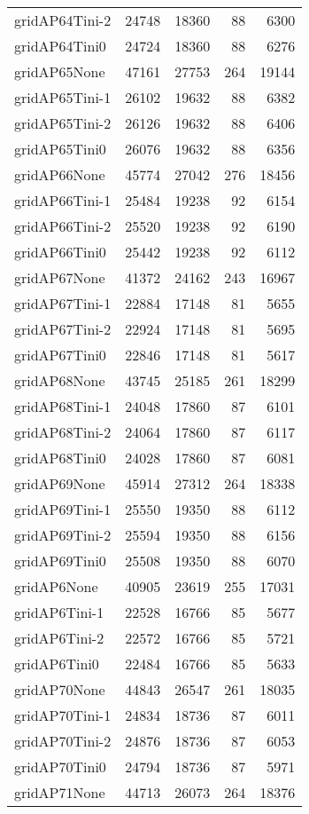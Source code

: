 \begin{longtable}{lrrrr}
gridAP64Tini-2 & 24748 & 18360 & 88 & 6300 \\
gridAP64Tini0 & 24724 & 18360 & 88 & 6276 \\
gridAP65None & 47161 & 27753 & 264 & 19144 \\
gridAP65Tini-1 & 26102 & 19632 & 88 & 6382 \\
gridAP65Tini-2 & 26126 & 19632 & 88 & 6406 \\
gridAP65Tini0 & 26076 & 19632 & 88 & 6356 \\
gridAP66None & 45774 & 27042 & 276 & 18456 \\
gridAP66Tini-1 & 25484 & 19238 & 92 & 6154 \\
gridAP66Tini-2 & 25520 & 19238 & 92 & 6190 \\
gridAP66Tini0 & 25442 & 19238 & 92 & 6112 \\
gridAP67None & 41372 & 24162 & 243 & 16967 \\
gridAP67Tini-1 & 22884 & 17148 & 81 & 5655 \\
gridAP67Tini-2 & 22924 & 17148 & 81 & 5695 \\
gridAP67Tini0 & 22846 & 17148 & 81 & 5617 \\
gridAP68None & 43745 & 25185 & 261 & 18299 \\
gridAP68Tini-1 & 24048 & 17860 & 87 & 6101 \\
gridAP68Tini-2 & 24064 & 17860 & 87 & 6117 \\
gridAP68Tini0 & 24028 & 17860 & 87 & 6081 \\
gridAP69None & 45914 & 27312 & 264 & 18338 \\
gridAP69Tini-1 & 25550 & 19350 & 88 & 6112 \\
gridAP69Tini-2 & 25594 & 19350 & 88 & 6156 \\
gridAP69Tini0 & 25508 & 19350 & 88 & 6070 \\
gridAP6None & 40905 & 23619 & 255 & 17031 \\
gridAP6Tini-1 & 22528 & 16766 & 85 & 5677 \\
gridAP6Tini-2 & 22572 & 16766 & 85 & 5721 \\
gridAP6Tini0 & 22484 & 16766 & 85 & 5633 \\
gridAP70None & 44843 & 26547 & 261 & 18035 \\
gridAP70Tini-1 & 24834 & 18736 & 87 & 6011 \\
gridAP70Tini-2 & 24876 & 18736 & 87 & 6053 \\
gridAP70Tini0 & 24794 & 18736 & 87 & 5971 \\
gridAP71None & 44713 & 26073 & 264 & 18376 \\

\end{longtable}
